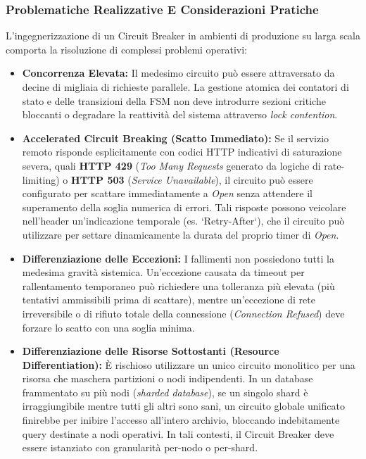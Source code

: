 \documentclass[11pt, a4paper]{article}
\begin{document}
\subsubsection{Problematiche Realizzative E Considerazioni Pratiche}

L'ingegnerizzazione di un Circuit Breaker in ambienti di produzione su larga scala comporta la risoluzione di complessi problemi operativi:

\begin{itemize}
    \item \textbf{Concorrenza Elevata:} Il medesimo circuito può essere attraversato da decine di migliaia di richieste parallele. La gestione atomica dei contatori di stato e delle transizioni della FSM non deve introdurre sezioni critiche bloccanti o degradare la reattività del sistema attraverso \emph{lock contention}.
    \item \textbf{Accelerated Circuit Breaking (Scatto Immediato):} Se il servizio remoto risponde esplicitamente con codici HTTP indicativi di saturazione severa, quali \textbf{HTTP 429} (\emph{Too Many Requests} generato da logiche di rate-limiting) o \textbf{HTTP 503} (\emph{Service Unavailable}), il circuito può essere configurato per scattare immediatamente a \emph{Open} senza attendere il superamento della soglia numerica di errori. Tali risposte possono veicolare nell'header un'indicazione temporale (es. `Retry-After`), che il circuito può utilizzare per settare dinamicamente la durata del proprio timer di \emph{Open}.
    \item \textbf{Differenziazione delle Eccezioni:} I fallimenti non possiedono tutti la medesima gravità sistemica. Un'eccezione causata da timeout per rallentamento temporaneo può richiedere una tolleranza più elevata (più tentativi ammissibili prima di scattare), mentre un'eccezione di rete irreversibile o di rifiuto totale della connessione (\emph{Connection Refused}) deve forzare lo scatto con una soglia minima.
    \item \textbf{Differenziazione delle Risorse Sottostanti (Resource Differentiation):} È rischioso utilizzare un unico circuito monolitico per una risorsa che maschera partizioni o nodi indipendenti. In un database frammentato su più nodi (\emph{sharded database}), se un singolo shard è irraggiungibile mentre tutti gli altri sono sani, un circuito globale unificato finirebbe per inibire l'accesso all'intero archivio, bloccando indebitamente query destinate a nodi operativi. In tali contesti, il Circuit Breaker deve essere istanziato con granularità per-nodo o per-shard.

\end{itemize}
\end{document}
